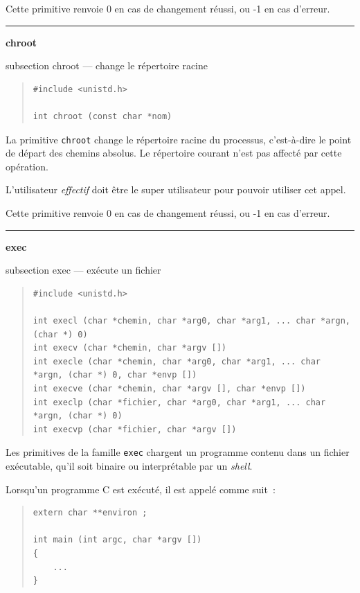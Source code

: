 \documentclass [twoside] {report}
\newcommand {\primitive} [1]
    {
	\phantomsection
	{\large \textbf {#1}}
	\addcontentsline {toc} {subsection} {#1}
    }
\newcommand {\separation}
    {
	\vspace {5mm}
	\nopagebreak
	\hrule
    }
\begin{document}
Cette primitive renvoie 0 en cas de changement
réussi, ou -1 en cas d'erreur.




\separation
\primitive {chroot} --- change le répertoire racine

\begin {quote}
\begin {verbatim}
#include <unistd.h>

int chroot (const char *nom)
\end{verbatim}
\end {quote}

La primitive \texttt {chroot} change le répertoire
racine du processus, c'est-à-dire le point de
départ des chemins absolus. Le répertoire courant
n'est pas affecté par cette opération.

L'utilisateur \emph {effectif} doit être le super
utilisateur pour pouvoir utiliser cet appel.

Cette primitive renvoie 0 en cas de changement
réussi, ou -1 en cas d'erreur.




\separation
\primitive {exec} --- exécute un fichier

\begin {quote}
\begin {verbatim}
#include <unistd.h>

int execl (char *chemin, char *arg0, char *arg1, ... char *argn, (char *) 0)
int execv (char *chemin, char *argv [])
int execle (char *chemin, char *arg0, char *arg1, ... char *argn, (char *) 0, char *envp [])
int execve (char *chemin, char *argv [], char *envp [])
int execlp (char *fichier, char *arg0, char *arg1, ... char *argn, (char *) 0)
int execvp (char *fichier, char *argv [])
\end{verbatim}
\end {quote}

Les primitives de la famille \texttt {exec} chargent un
programme contenu dans un fichier exécutable,
qu'il soit binaire ou interprétable par un
\emph {shell}.

Lorsqu'un programme C est exécuté, il est appelé
comme suit~:

\begin {quote}
\begin {verbatim}
extern char **environ ;

int main (int argc, char *argv [])
{
    ...
}
\end{verbatim}
\end {quote}
\end{document}
